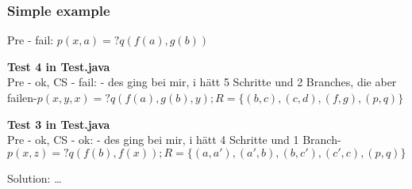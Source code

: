 		\begin{frame}[fragile=singleslide]
	\frametitle{Simple example}
	Pre - fail:  $p(x,a) =? q(f(a),g(b))$\\
		\vspace{0.5cm}
		
		
		\textbf{Test 4 in Test.java}\\
		Pre - ok, CS - fail: \textcolor[rgb]{0,0.58,0}{- des ging bei mir, i hätt 5 Schritte und 2 Branches, die aber failen-}$p(x,y,x) =? q(f(a),g(b),y) ; R=\{(b,c),(c,d),(f,g),(p,q)\}$\\
		\vspace{0.5cm}
		
		\textbf{Test 3 in Test.java}\\
		Pre - ok, CS - ok: \textcolor[rgb]{0,0.58,0}{- des ging bei mir, i hätt 4 Schritte und 1 Branch-}$p(x,z) =? q(f(b),f(x)) ; R=\{(a,a'),(a',b),(b,c'),(c',c),(p,q)\}$\\
		\vspace{0.5cm}
		
		Solution: \ldots
	
  \end{frame}	
	
